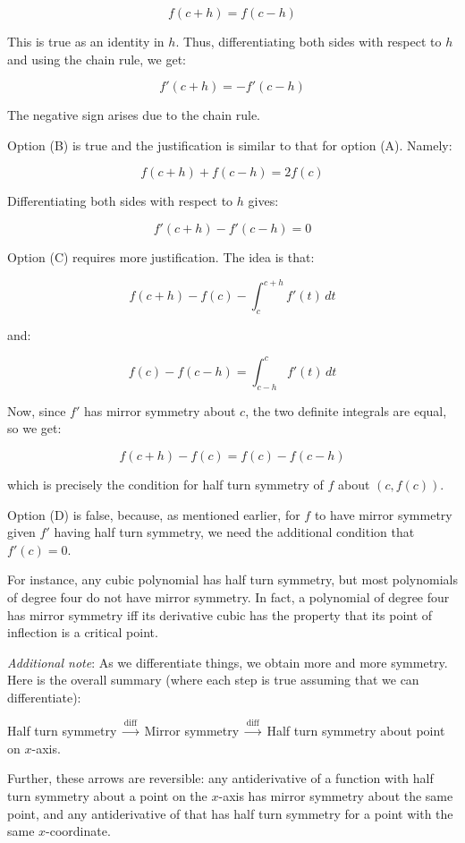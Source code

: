 \documentclass[10pt]{amsart}
\begin{document}
\begin{enumerate}
  $$f(c + h) = f(c - h)$$

  This is true as an identity in $h$. Thus, differentiating both sides
  with respect to $h$ and using the chain rule, we get:

  $$f'(c + h) = -f'(c - h)$$

  The negative sign arises due to the chain rule.

  Option (B) is true and the justification is similar to that for
  option (A). Namely:

  $$f(c + h) + f(c - h) = 2f(c)$$

  Differentiating both sides with respect to $h$ gives:

  $$f'(c + h) - f'(c - h) = 0$$

  Option (C) requires more justification. The idea is that:

  $$f(c + h) - f(c) - \int_c^{c + h} f'(t) \, dt$$

  and:

  $$f(c) - f(c - h) = \int_{c - h}^c f'(t) \, dt$$

  Now, since $f'$ has mirror symmetry about $c$, the two definite
  integrals are equal, so we get:

  $$f(c + h) - f(c) = f(c) - f(c - h)$$

  which is precisely the condition for half turn symmetry of $f$ about
  $(c,f(c))$.

  Option (D) is false, because, as mentioned earlier, for $f$ to have
  mirror symmetry given $f'$ having half turn symmetry, we need the
  additional condition that $f'(c) = 0$.

  For instance, any cubic polynomial has half turn symmetry, but most
  polynomials of degree four do not have mirror symmetry. In fact, a
  polynomial of degree four has mirror symmetry iff its derivative
  cubic has the property that its point of inflection is a critical
  point.

  {\em Additional note}: As we differentiate things, we obtain more
  and more symmetry. Here is the overall summary (where each step is
  true assuming that we can differentiate):

  Half turn symmetry $\stackrel{\text{diff}}{\to}$ Mirror symmetry
  $\stackrel{\text{diff}}{\to}$ Half turn symmetry about point on $x$-axis.

  Further, these arrows are reversible: any antiderivative of a
  function with half turn symmetry about a point on the $x$-axis has
  mirror symmetry about the same point, and any antiderivative of that
  has half turn symmetry for a point with the same $x$-coordinate.


\end{enumerate}
\end{document}
